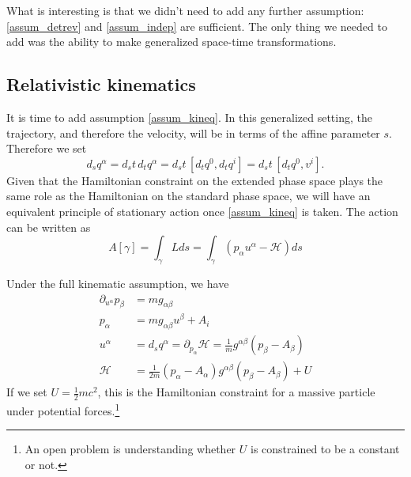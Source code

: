 What is interesting is that we didn't need to add any further assumption: \ref{assum_detrev} and \ref{assum_indep} are sufficient. The only thing we needed to add was the ability to make generalized space-time transformations.

\subsection{Relativistic kinematics}

It is time to add assumption \ref{assum_kineq}. In this generalized setting, the trajectory, and therefore the velocity, will be in terms of the affine parameter $s$. Therefore we set
\begin{equation}
	d_s q^\alpha  = d_s t \, d_t q^\alpha = d_s t \, [ d_t q^0, d_t q^i  ] = d_s t \, [ d_t q^0, v^i  ] .
\end{equation}
Given that the Hamiltonian constraint on the extended phase space plays the same role as the Hamiltonian on the standard phase space, we will have an equivalent principle of stationary action once \ref{assum_kineq} is taken. The action can be written as
\begin{equation}
	A[\gamma] = \int_\gamma Lds = \int_\gamma \left( p_\alpha u^\alpha - \mathcal{H} \right) ds
\end{equation}

Under the full kinematic assumption, we have
\begin{equation}
	\begin{aligned}
	\partial_{u^\alpha} p_\beta &= mg_{\alpha \beta} \\
	p_{\alpha} &= mg_{\alpha \beta} u^\beta + A_i \\
u^{\alpha} &= d_s q^\alpha = \partial_{p_\alpha} \mathcal{H} = \frac{1}{m} g^{\alpha \beta} (p_\beta - A_\beta) \\
\mathcal{H} &= \frac{1}{2m}\left(p_\alpha - A_{\alpha}\right)g^{\alpha \beta} \left(p_\beta - A_{\beta}\right) + U
	\end{aligned}
\end{equation}
If we set $U=\frac{1}{2} m c^2$, this is the Hamiltonian constraint for a massive particle under potential forces.\footnote{An open problem is understanding whether $U$ is constrained to be a constant or not.}


